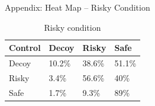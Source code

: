 \documentclass[
  ignorenonframetext,
  aspectratio=169]{beamer}
\begin{document}
\begin{frame}{Appendix: Heat Map -- Risky Condition}
\label{appendix-heat-map-risky-condition}
\begin{table}
\centering
\caption{\label{tab:unnamed-chunk-10}Risky condition}
\centering
\begin{tabular}[t]{llll}
\toprule
Control & Decoy & Risky & Safe\\
\midrule
Decoy & 10.2\% & 38.6\% & 51.1\%\\
Risky & 3.4\% & 56.6\% & 40\%\\
Safe & 1.7\% & 9.3\% & 89\%\\
\bottomrule
\end{tabular}
\end{table}
\end{frame}
\end{document}
